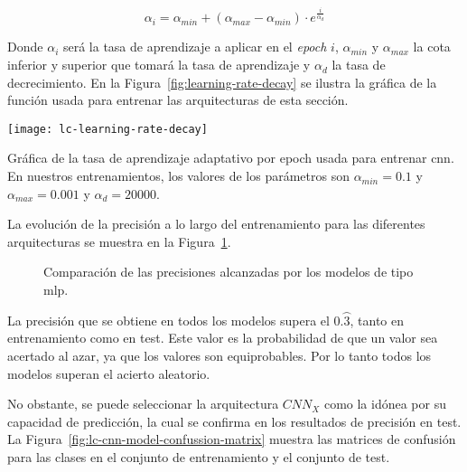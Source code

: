 \begin{equation}
    \alpha_i = \alpha_{min} + (\alpha_{max} - \alpha_{min}) \cdot e^\frac{i}{\alpha_d}
	\label{eq:learning-rate-decay}
\end{equation}

Donde $\alpha_i$ será la tasa de aprendizaje a aplicar en el \textit{epoch} $i$, $\alpha_{min}$ y $\alpha_{max}$ la cota inferior y superior que tomará la tasa de aprendizaje y $\alpha_d$ la tasa de decrecimiento. En la Figura~\ref{fig:learning-rate-decay} se ilustra la gráfica de la función usada para entrenar las arquitecturas de esta sección.

\begin{marginfigure}
	\centering
	\texttt{[image: lc-learning-rate-decay]}
	\caption[Gráfica de la tasa de aprendizaje adaptativo por epoch usada para entrenar \ac{cnn}]{Gráfica de la tasa de aprendizaje adaptativo por epoch usada para entrenar \ac{cnn}. En nuestros entrenamientos, los valores de los parámetros son $\alpha_{min} = 0.1$ y $\alpha_{max} = 0.001$ y $\alpha_d = 20000$.}
	\label{fig:learning-rate-decay}
\end{marginfigure}

La evolución de la precisión a lo largo del entrenamiento para las diferentes arquitecturas se muestra en la Figura~\ref{fig:lc-cnn-training-validation-test-comparison}.

\begin{figure}
	\centering
	\qquad
	\caption[Comparación de las precisiones alcanzadas por los modelos de tipo \ac{mlp}]{Comparación de las precisiones alcanzadas por los modelos de tipo \ac{mlp}.}
	\label{fig:lc-cnn-training-validation-test-comparison}
\end{figure}

La precisión que se obtiene en todos los modelos supera el $0.\wideparen{3}$, tanto en entrenamiento como en test. Este valor es la probabilidad de que un valor sea acertado al azar, ya que los valores son equiprobables. Por lo tanto todos los modelos superan el acierto aleatorio.


No obstante, se puede seleccionar la arquitectura $CNN_X$ como la idónea por su capacidad de predicción, la cual se confirma en los resultados de precisión en test. La Figura~\ref{fig:lc-cnn-model-confussion-matrix} muestra las matrices de confusión para las clases en el conjunto de entrenamiento y el conjunto de test.

